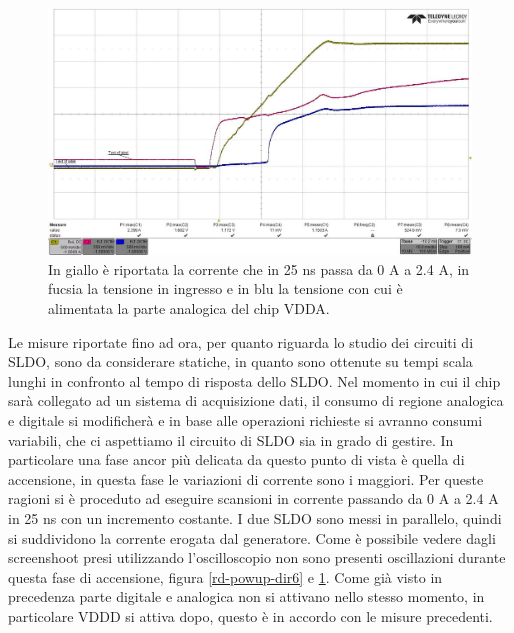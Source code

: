 \begin{figure}
\centering
\includegraphics[scale=.3]{Immagini/rd-powup-dir7}
\caption{In giallo è riportata la corrente che in 25 ns passa da 0 A a 2.4 A, in fucsia la tensione in ingresso e in blu la tensione con cui è alimentata la parte analogica del chip VDDA.}
\label{rd-powup-dir7}
\end{figure}
Le misure riportate fino ad ora, per quanto riguarda lo studio dei circuiti di SLDO, sono da considerare statiche, in quanto sono ottenute su tempi scala lunghi in confronto al tempo di risposta dello SLDO. 
Nel momento in cui il chip sarà collegato ad un sistema di acquisizione dati, il consumo di regione analogica e digitale si modificherà e in base alle operazioni richieste si avranno consumi variabili, che ci aspettiamo il circuito di SLDO sia in grado di gestire. 
In particolare una fase ancor più delicata da questo punto di vista è quella di accensione, in questa fase le variazioni di corrente sono i maggiori. 
Per queste ragioni si è proceduto ad eseguire scansioni in corrente passando da 0 A a 2.4 A in 25 ns con un incremento costante. I due SLDO sono messi in parallelo, quindi si suddividono la corrente erogata dal generatore. Come è possibile vedere dagli screenshoot presi utilizzando l'oscilloscopio non sono presenti oscillazioni durante questa fase di accensione, figura \ref{rd-powup-dir6} e \ref{rd-powup-dir7}. 
Come già visto in precedenza parte digitale e analogica non si attivano nello stesso momento, in particolare VDDD si attiva dopo, questo è in accordo con le misure precedenti.


